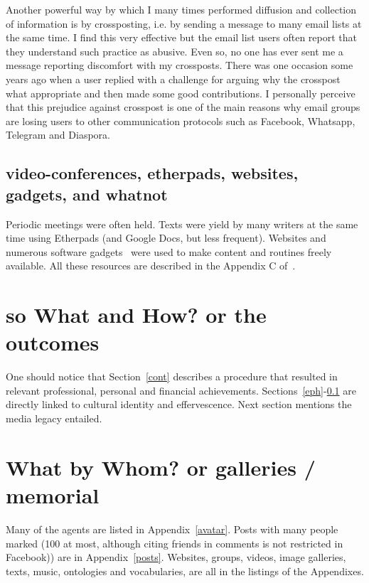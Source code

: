 \documentclass[a4paper]{article}
\begin{document}
Another powerful way by which I many times performed diffusion and collection
of information is by crossposting, i.e. by sending a message to many email lists
at the same time.
I find this very effective but the email list users often report that they understand such practice
as abusive.
Even so, no one has ever sent me a message reporting discomfort with my crossposts.
There was one occasion some years ago when a user replied with a challenge for
arguing why the crosspost what appropriate and then made some good contributions.
I personally perceive that this prejudice against crosspost is one of the main reasons
why email groups are losing users to other communication protocols such as Facebook, Whatsapp, Telegram and Diaspora.

\subsection{video-conferences, etherpads, websites, gadgets, and whatnot}\label{video}
Periodic meetings were often held.
Texts were yield by many writers at the same time using Etherpads (and Google Docs, but less frequent).
Websites and numerous software gadgets~\cite{ttmRepos} were used to make content and routines
freely available. All these resources are described in the Appendix C of~\cite{thesis}.
      
\section{so What and How? or the outcomes}
One should notice that Section~\ref{cont} describes a procedure that resulted in
relevant professional, personal and financial achievements.
Sections~\ref{eph}-\ref{video} are directly linked to cultural identity and effervescence.
Next section mentions the media legacy entailed.

\section{What by Whom? or galleries / memorial}
Many of the agents are listed in Appendix~\ref{avatar}.
Posts with many people marked (100 at most, although citing friends in comments is not restricted in Facebook)) are in Appendix~\ref{posts}.
Websites, groups, videos, image galleries, texts, music, ontologies and vocabularies, are all in the listings of the Appendixes.
\end{document}
